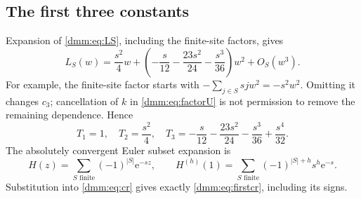\documentclass[11pt,letterpaper]{article}
\numberwithin{equation}{section}
\theoremstyle{definition}\newtheorem{definition}[theorem]{Definition}
\theoremstyle{remark}\newtheorem{remark}[theorem]{Remark}
\newcommand{\ee}{\mathrm e}
\begin{document}
\subsection{The first three constants}
Expansion of \eqref{dmm:eq:LS}, including the finite-site factors, gives
\begin{equation}\label{dmm:eq:Lfirst}
L_S(w)=\frac{s^2}4w+
\left(-\frac{s}{12}-\frac{23s^2}{24}-\frac{s^3}{36}\right)w^2
+O_S(w^3).
\end{equation}
For example, the finite-site factor starts with
$-\sum_{j\in S}sjw^2=-s^2w^2$. Omitting it changes $c_3$; cancellation of $k$ in \eqref{dmm:eq:factorU} is not permission to remove the remaining dependence. Hence
\begin{equation}\label{dmm:eq:Tfirst}
T_1=1,\quad T_2=\frac{s^2}4,\quad
T_3=-\frac{s}{12}-\frac{23s^2}{24}-\frac{s^3}{36}+\frac{s^4}{32}.
\end{equation}
The absolutely convergent Euler subset expansion is
\[
H(z)=\sum_{S\text{ finite}}(-1)^{|S|}\ee^{-s z},
\qquad
H^{(h)}(1)=\sum_{S\text{ finite}}(-1)^{|S|+h}s^h\ee^{-s}.
\]
Substitution into \eqref{dmm:eq:cr} gives exactly \eqref{dmm:eq:firstcr}, including its signs.
\end{document}
